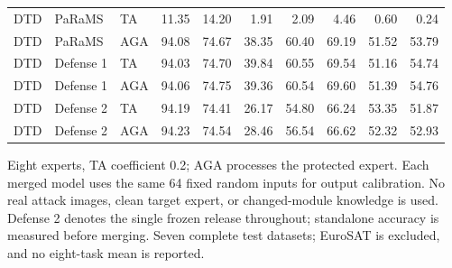 \begin{table}[t]
\begin{tabular}{@{}lllrrrrrrr@{}}
DTD & PaRaMS & TA & 11.35 & 14.20 & 1.91 & 2.09 & 4.46 & 0.60 & 0.24 \\
DTD & PaRaMS & AGA & 94.08 & 74.67 & 38.35 & 60.40 & 69.19 & 51.52 & 53.79 \\
DTD & Defense 1 & TA & 94.03 & 74.70 & 39.84 & 60.55 & 69.54 & 51.16 & 54.74 \\
DTD & Defense 1 & AGA & 94.06 & 74.75 & 39.36 & 60.54 & 69.60 & 51.39 & 54.76 \\
DTD & Defense 2 & TA & 94.19 & 74.41 & 26.17 & 54.80 & 66.24 & 53.35 & 51.87 \\
DTD & Defense 2 & AGA & 94.23 & 74.54 & 28.46 & 56.54 & 66.62 & 52.32 & 52.93 \\
\bottomrule
\end{tabular}
\par\smallskip
\begin{minipage}{\textwidth}\footnotesize Eight experts, TA coefficient 0.2; AGA processes the protected expert. Each merged model uses the same 64 fixed random inputs for output calibration. No real attack images, clean target expert, or changed-module knowledge is used. Defense 2 denotes the single frozen release throughout; standalone accuracy is measured before merging. Seven complete test datasets; EuroSAT is excluded, and no eight-task mean is reported.\end{minipage}
\end{table}
